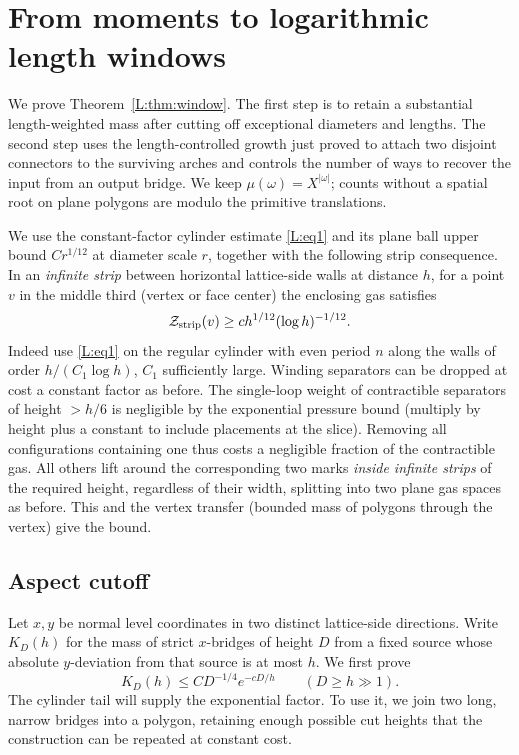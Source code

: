 \section{From moments to logarithmic length windows}\label{L:part11}

We prove Theorem~\ref{L:thm:window}. The first step is to retain a substantial length-weighted mass after cutting off exceptional diameters and lengths. The second step uses the length-controlled growth just proved to attach two disjoint connectors to the surviving arches and controls the number of ways to recover the input from an output bridge. We keep \(\mu(\omega)=X^{|\omega|}\); counts without a spatial root on plane polygons are modulo the primitive translations.

We use the constant-factor cylinder estimate \eqref{L:eq1} and its plane ball upper bound \(C r^{1/12}\) at diameter scale \(r\), together with the following strip consequence. In an \emph{infinite strip} between horizontal lattice-side walls at distance \(h\), for a point \(v\) in the middle third (vertex or face center) the enclosing gas satisfies
\[
 {\cal Z}_{\rm strip}(v)\ge c h^{1/12}(\log h)^{-1/12}.
\]
Indeed use \eqref{L:eq1} on the regular cylinder with even period \(n\) along the walls of order \(h/(C_1\log h)\), \(C_1\) sufficiently large. Winding separators can be dropped at cost a constant factor as before. The single-loop weight of contractible separators of height \(>h/6\) is negligible by the exponential pressure bound (multiply by height plus a constant to include placements at the slice). Removing all configurations containing one thus costs a negligible fraction of the contractible gas. All others lift around the corresponding two marks \emph{inside infinite strips} of the required height, regardless of their width, splitting into two plane gas spaces as before. This and the vertex transfer (bounded mass of polygons through the vertex) give the bound.

\subsection{Aspect cutoff}\label{L:step18}\label{L:prop:aspect}

Let $x,y$ be normal level coordinates in two distinct lattice-side
 directions.  Write $K_D(h)$ for the mass of strict $x$-bridges of height
$D$ from a fixed source whose absolute $y$-deviation from that source is
at most $h$.  We first prove
\begin{equation}\label{L:eq:aspect-bound}
 K_D(h)\le C D^{-1/4}e^{-cD/h}\qquad(D\ge h\gg1).
\end{equation}
The cylinder tail will supply the exponential factor.  To use it, we
join two long, narrow bridges into a polygon, retaining enough possible
cut heights that the construction can be repeated at constant cost.

